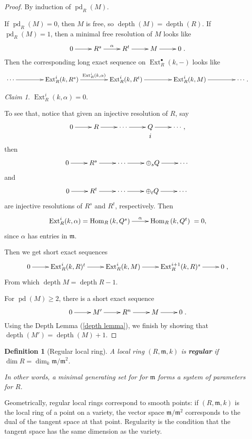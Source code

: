 \documentclass[11pt]{book}
\newtheorem{definition}[theorem]{Definition}
\numberwithin{equation}{section}
\numberwithin{theorem}{chapter}
\theoremstyle{definition}
\newtheorem*{basic properties}{Basic Properties}
\newtheorem*{Important Remark}{Important Remark}
\theoremstyle{remark}
\newtheorem*{claim*}{Claim}
\newcommand{\m}{\mathfrak{m}}
\newcommand{\Hom}{\operatorname{Hom}}
\newcommand{\Ext}{\operatorname{Ext}}
\renewcommand{\dim}{\operatorname{dim}}
\newcommand{\depth}{\operatorname{depth}}
\newcommand{\pd}{\operatorname{pd}}
\begin{document}
\begin{proof}
	By induction of $\pd_R(M)$.
	
	If $\pd_R(M) = 0$, then $M$ is free, so $\depth(M) = \depth(R)$. If $\pd_R(M) = 1$, then a minimal free resolution of $M$ looks like
	$$\xymatrix{0 \ar[r] & R^s \ar[r]^-{\alpha} & R^t \ar[r] & M \ar[r] & 0}.$$
	Then the corresponding long exact sequence on $\Ext^\bullet_R(k,-)$ looks like
		$$\xymatrix@C=15mm{\cdots \ar[r] & \Ext^i_R(k,R^s) \ar[r]^-{\Ext^i_R(k,\alpha)} & \Ext^i_R(k,R^t) \ar[r] & \Ext^i_R(k,M) \ar[r] & \cdots}.$$
	\begin{claim*}
		$\Ext^i_R(k,\alpha) = 0$.
	\end{claim*}
	
	To see that, notice that given an injective resolution of $R$, say
	$$\xymatrix@R=0.01mm{0 \ar[r] & R \ar[r] & \cdots \ar[r] & Q \ar[r] & \cdots \\ &&& i & },$$
	then
	$$\xymatrix@R=0.05mm{0 \ar[r] & R^s \ar[r] & \cdots \ar[r] & \oplus_s Q \ar[r] & \cdots}$$
	and
	$$\xymatrix@R=0.05mm{0 \ar[r] & R^t \ar[r] & \cdots \ar[r] & \oplus_t Q \ar[r] & \cdots}$$
	are injective resolutions of $R^s$ and $R^t$, respectively. Then
	$$\xymatrix{\Ext^i_R(k, \alpha) = \Hom_R \left( k, Q^s \right) \ar[r]^-\alpha & \Hom_R \left( k, Q^t \right)} = 0,$$
	since $\alpha$ has entries in $\m$.
	
	Then we get short exact sequences
	$$\xymatrix{0 \ar[r] & \Ext^i_R(k,R)^t \ar[r] & \Ext^i_R(k,M) \ar[r] & \Ext^{i+1}_R(k,R)^s \ar[r] & 0},$$
	From which $\depth M = \depth R - 1$.
	
	For $\pd(M) \geqslant 2$, there is a short exact sequence
	$$\xymatrix{0 \ar[r] & M' \ar[r] & R^n \ar[r] & M \ar[r] & 0}.$$
	Using the Depth Lemma (\ref{depth lemma}), we finish by showing that $\depth(M') = \depth(M) + 1$.
\end{proof}


\begin{definition}[Regular local ring]
	A local ring $(R, \m, k)$ is {\bf regular} if $\dim R = \dim_k \m / \m^2$.
	
	In other words, a minimal generating set for for $\m$ forms a system of parameters for $R$.
\end{definition}

Geometrically, regular local rings correspond to smooth points: if $(R,\m,k)$ is the local ring of a point on a variety, the vector space $\m/\m^2$ corresponds to the dual of the tangent space at that point. Regularity is the condition that the tangent space has the same dimension as the variety.
\end{document}
